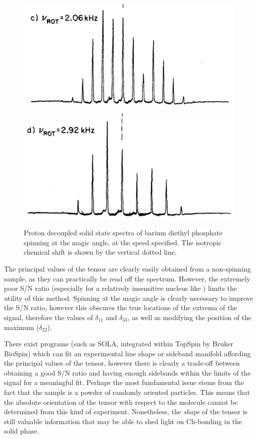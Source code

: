 \begin{refsection}
\begin{figure}
    \includegraphics[width=0.45\linewidth]{Figures/31P-ssnmr-2.06khz.pdf}
    \includegraphics[width=0.45\linewidth]{Figures/31P-ssnmr-2.92khz.pdf}
    \caption[31P SS-NMR spinning at the magic angle.]{Proton decoupled solid state  spectra of barium diethyl phosphate spinning at the magic angle, at the speed specified. The isotropic chemical shift is shown by the vertical dotted line.}\label{fig:31P-ssnmr}
\end{figure}

The principal values of the tensor are clearly easily obtained from a non-spinning sample, as they can practically be read off the spectrum.
However, the extremely poor S/N ratio (especially for a relatively insensitive nucleus like ) limits the utility of this method.
Spinning at the magic angle is clearly necessary to improve the S/N ratio, however this obscures the true locations of the extrema of the signal, therefore the values of $ \delta_{11} $ and $ \delta_{33} $, as well as modifying the position of the maximum ($ \delta_{22} $).

There exist programs (such as SOLA, integrated within TopSpin by Bruker BioSpin) which can fit an experimental line shape or sideband manifold affording the principal values of the tensor, however there is clearly a trade-off between obtaining a good S/N ratio and having enough sidebands within the limits of the signal for a meaningful fit.
Perhaps the most fundamental issue stems from the fact that the sample is a powder of randomly oriented particles.
This means that the absolute orientation of the tensor with respect to the molecule cannot be determined from this kind of experiment.
Nonetheless, the \emph{shape} of the tensor is still valuable information that may be able to shed light on Ch-bonding in the solid phase.

\printbibliography[heading=subbibliography]
\end{refsection}
